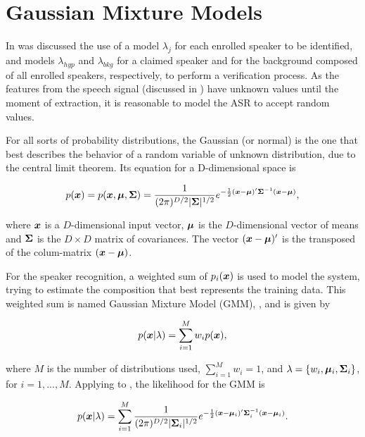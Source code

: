 \chapter{Gaussian Mixture Models}
\label{ch:gmm}

In  was discussed the use of a model $\lambda_j$ for each enrolled speaker to be identified, and models $\lambda_{hyp}$ and $\lambda_{bkg}$ for a claimed speaker and for the background composed of all enrolled speakers, respectively, to perform a verification process. As the features from the speech signal (discussed in ) have unknown values until the moment of extraction, it is reasonable to model the ASR to accept random values.

For all sorts of probability distributions, the Gaussian (or normal) is the one that best describes the behavior of a random variable of unknown distribution, due to the central limit theorem. Its equation for a D-dimensional space is

\begin{equation}
    \pdf{\dvec{x}} = p(\dvec{x},\dvec{\mu},\dvec{\Sigma}) = \dgaussian{x}{\mu}{\Sigma},
    \label{eq:gaussian}
\end{equation}

\noindent where $\boldsymbol{x}$ is a $D$-dimensional input vector, $\boldsymbol{\mu}$ is the $D$-dimensional vector of means and $\boldsymbol{\Sigma}$ is the $D \times D$ matrix of covariances. The vector $(\boldsymbol{x} - \boldsymbol{\mu})'$ is the transposed of the colum-matrix $(\boldsymbol{x} - \boldsymbol{\mu})$.

For the speaker recognition, a weighted sum of $p_i(\boldsymbol{x})$ is used to model the system, trying to estimate the composition that best represents the training data. This weighted sum is named Gaussian Mixture Model (GMM), , and is given by

\begin{equation}
    \postpdf{\dvec{x}}{\lambda} = \sum_{i=1}^M w_i\pdf{\dvec{x}},
    \label{eq:gaussian_mixture}
\end{equation}

\noindent where $M$ is the number of distributions used, $\sum_{i=1}^M w_i = 1$, and $\lambda = \{w_i, \boldsymbol{\mu}_i,\boldsymbol{\Sigma}_i\}$, for $i = 1, ..., M$. Applying  to , the likelihood for the GMM is

\begin{equation}
    \postpdf{\dvec{x}}{\lambda} = \dgaussianmixture.
    \label{eq:likelihood_gmm}
\end{equation}

